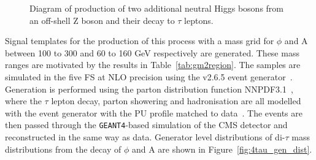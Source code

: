 \begin{figure}[H]
\centering
{}
\vspace*{10mm}
\caption{Diagram of production of two additional neutral Higgs bosons from an off-shell Z boson and their decay to $\tau$ leptons.}
\label{fig:4tau_feynamn}
\end{figure}

Signal templates for the production of this process with a mass grid for $\phi$ and A between 100 to 300 and 60 to 160 GeV respectively are generated.
These mass ranges are motivated by the results in Table~\ref{tab:gm2region}.
The samples are simulated in the five \ac{FS} at \ac{NLO} precision using the \MGvATNLO v2.6.5 event generator~\cite{Alwall:2011uj}.
Generation is performed using the parton distribution function NNPDF3.1~\cite{Ball:2014uwa,Ball:2017nwa}, where the $\tau$ lepton decay, parton showering and hadronisation are all modelled with the \PYTHIA event generator with the \ac{PU} profile matched to data~\cite{Sirunyan:2019dfx,Sjostrand:2014zea}.
The events are then passed through the \texttt{GEANT4}-based \cite{Agostinelli:2002hh} simulation of the \ac{CMS} detector and reconstructed in the same way as data.
Generator level distributions of di-$\tau$ mass distributions from the decay of $\phi$ and A are shown in Figure~\ref{fig:4tau_gen_dist}.\\


